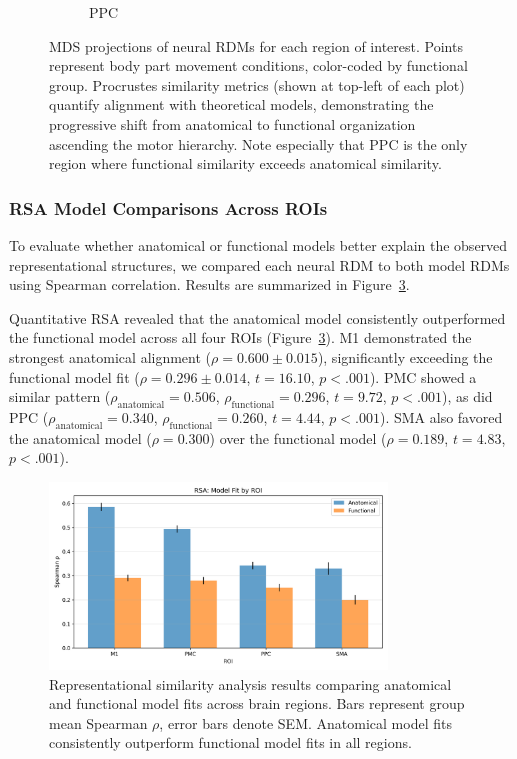 \documentclass{article}
\begin{document}
\begin{figure}[!htbp]
\begin{subfigure}[b]{0.45\textwidth}
        \caption{PPC}
        \label{fig:mds_ppc}
    \end{subfigure}
\caption{MDS projections of neural RDMs for each region of interest. Points represent body part movement conditions, color-coded by functional group. Procrustes similarity metrics (shown at top-left of each plot) quantify alignment with theoretical models, demonstrating the progressive shift from anatomical to functional organization ascending the motor hierarchy. Note especially that PPC is the only region where functional similarity exceeds anatomical similarity.}
\label{fig:mds_all}
\end{figure}

\subsubsection{RSA Model Comparisons Across ROIs}
To evaluate whether anatomical or functional models better explain the observed representational structures, we compared each neural RDM to both model RDMs using Spearman correlation. Results are summarized in Figure~\ref{fig:rsa}.

Quantitative RSA revealed that the anatomical model consistently outperformed the functional model across all four ROIs (Figure~\ref{fig:rsa}). M1 demonstrated the strongest anatomical alignment (\(\rho = 0.600 \pm 0.015\)), significantly exceeding the functional model fit (\(\rho = 0.296 \pm 0.014\), \(t = 16.10\), \(p < .001\)). PMC showed a similar pattern (\(\rho_{\text{anatomical}} = 0.506\), \(\rho_{\text{functional}} = 0.296\), \(t = 9.72\), \(p < .001\)), as did PPC (\(\rho_{\text{anatomical}} = 0.340\), \(\rho_{\text{functional}} = 0.260\), \(t = 4.44\), \(p < .001\)). SMA also favored the anatomical model (\(\rho = 0.300\)) over the functional model (\(\rho = 0.189\), \(t = 4.83\), \(p < .001\)).

\begin{figure}[!htbp]
\centering
\includegraphics[width=0.8\textwidth]{results/rsa_model_fit_by_roi.png}
\caption{Representational similarity analysis results comparing anatomical and functional model fits across brain regions. Bars represent group mean Spearman \(\rho\), error bars denote SEM. Anatomical model fits consistently outperform functional model fits in all regions.}
\label{fig:rsa}
\end{figure}
\end{document}

